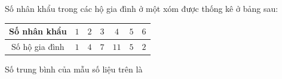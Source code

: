 \begin{ex}
Số nhân khẩu trong các hộ gia đình ở một xóm được thống kê ở bảng sau:
\begin{center}
\begin{tabular}{|c|c|c|c|c|c|c|}\hline
Số nhân khẩu & $1$ & $2$ & $3$ & $4$ & $5$ & $6$\\\hline
Số hộ gia đình & $1$ & $4$ & $7$ & $11$ & $5$ & $2$\\\hline
\end{tabular}
\end{center}
Số trung bình của mẫu số liệu trên là
\end{ex}
